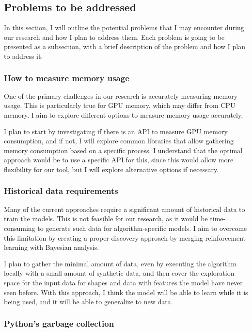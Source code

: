 \subsection{Problems to be addressed}
\label{subsec:problems-to-be-addressed}

In this section, I will outline the potential problems that I may encounter during our research and how I plan to address them.
Each problem is going to be presented as a subsection, with a brief description of the problem and how I plan to address it.

\subsubsection{How to measure memory usage}

One of the primary challenges in our research is accurately measuring memory usage.
This is particularly true for \ac{GPU} memory, which may differ from \ac{CPU} memory.
I aim to explore different options to measure memory usage accurately.

I plan to start by investigating if there is an API to measure \ac{GPU} memory consumption, and if not, I will explore common libraries that allow gathering memory consumption based on a specific process.
I understand that the optimal approach would be to use a specific API for this, since this would allow more flexibility for our tool, but I will explore alternative options if necessary.

\subsubsection{Historical data requirements}

Many of the current approaches require a significant amount of historical data to train the models.
This is not feasible for our research, as it would be time-consuming to generate such data for algorithm-specific models.
I aim to overcome this limitation by creating a proper discovery approach by merging reinforcement learning with Bayesian analysis.

I plan to gather the minimal amount of data, even by executing the algorithm locally with a small amount of synthetic data, and then cover the exploration space for the input data for shapes and data with features the model have never seen before.
With this approach, I think the model will be able to learn while it is being used, and it will be able to generalize to new data.

\subsubsection{Python's garbage collection}

